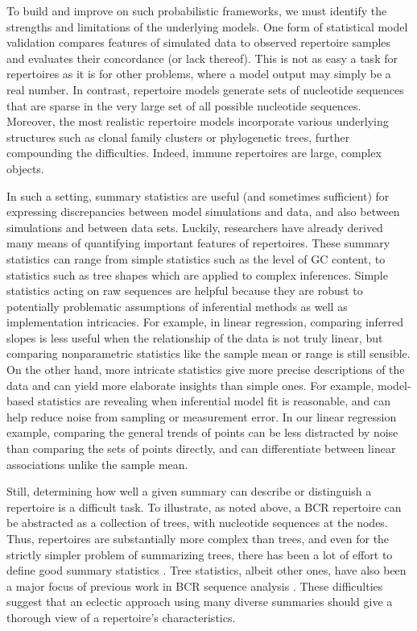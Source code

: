 \documentclass{article}
\begin{document}
To build and improve on such probabilistic frameworks, we must identify the strengths and limitations of the underlying models.
One form of statistical model validation compares features of simulated data to observed repertoire samples and evaluates their concordance (or lack thereof).
This is not as easy a task for repertoires as it is for other problems, where a model output may simply be a real number.
In contrast, repertoire models generate sets of nucleotide sequences that are sparse in the very large set of all possible nucleotide sequences.
Moreover, the most realistic repertoire models incorporate various underlying structures such as clonal family clusters or phylogenetic trees, further compounding the difficulties.
Indeed, immune repertoires are large, complex objects.

In such a setting, summary statistics are useful (and sometimes sufficient) for expressing discrepancies between model simulations and data, and also between simulations and between data sets.
Luckily, researchers have already derived many means of quantifying important features of repertoires.
These summary statistics can range from simple statistics such as the level of GC content, to statistics such as tree shapes which are applied to complex inferences.
Simple statistics acting on raw sequences are helpful because they are robust to potentially problematic assumptions of inferential methods as well as implementation intricacies.
For example, in linear regression, comparing inferred slopes is less useful when the relationship of the data is not truly linear, but comparing nonparametric statistics like the sample mean or range is still sensible.
On the other hand, more intricate statistics give more precise descriptions of the data and can yield more elaborate insights than simple ones.
For example, model-based statistics are revealing when inferential model fit is reasonable, and can help reduce noise from sampling or measurement error.
In our linear regression example, comparing the general trends of points can be less distracted by noise than comparing the sets of points directly, and can differentiate between linear associations unlike the sample mean.

Still, determining how well a given summary can describe or distinguish a repertoire is a difficult task.
To illustrate, as noted above, a BCR repertoire can be abstracted as a collection of trees, with nucleotide sequences at the nodes.
Thus, repertoires are substantially more complex than trees, and even for the strictly simpler problem of summarizing trees, there has been a lot of effort to define good summary statistics \cite{Mooers1997-jl}.
Tree statistics, albeit other ones, have also been a major focus of previous work in BCR sequence analysis \cite{Dunn-Walters2004-hv,Mehr2004-ej,Steiman-Shimony2006-fm,Shahaf2008-cc}.
These difficulties suggest that an eclectic approach using many diverse summaries should give a thorough view of a repertoire's characteristics.
\end{document}
